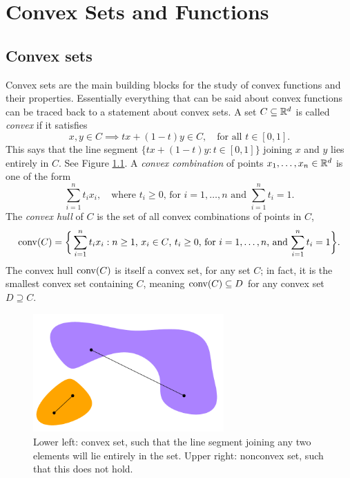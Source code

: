 \chapter{Convex Sets and Functions}
\label{chap:convex_sets_functions}

\section{Convex sets}  
\label{sec:convex_sets}

Convex sets are the main building blocks for the study of convex functions and
their properties. Essentially everything that can be said about convex
functions can be traced back to a statement about convex sets. A set $C
\subseteq \mathbb{R}^d$ is called \emph{convex} if it satisfies 
\begin{equation}
\label{eq:convex_set}
x, y \in C \implies t x + (1-t) y \in C, \quad \text{for all $t \in [0,1]$}. 
\end{equation}
This says that the line segment $\{ tx + (1-t) y : t \in [0,1] \}$ joining $x$
and $y$ lies entirely in $C$. See Figure \ref{fig:convex_set}. A \emph{convex 
  combination} of points $x_1,\ldots,x_n \in \mathbb{R}^d$ is one of the form   
\[
\sum_{i=1}^n t_i x_i, \quad \text{where $t_i \geq 0$, for $i=1,\ldots,n$ and 
  $\sum_{i=1}^n t_i = 1$}. 
\] 
The \emph{convex hull} of $C$ is the set of all convex combinations of points in
$C$, 
\[ 
\operatorname{conv}(C) = \bigg\{
\sum_{i=1}^n t_i x_i : 
\text{$n \geq 1$, $x_i \in C$, $t_i \geq 0$, for $i=1,\ldots,n$, and 
  $\sum_{i=1}^n t_i = 1$} \bigg\}. 
\]
The convex hull $\operatorname{conv}(C)$ is itself a convex set, for any set $C$; in fact, it
is the smallest convex set containing $C$, meaning $\operatorname{conv}(C) \subseteq D$ for 
any convex set $D \supseteq C$. 

\begin{figure}[tb]
\centering
\includegraphics[width=0.65\textwidth]{fig/convex_set.pdf}
\caption{Lower left: convex set, such that the line segment joining any two 
  elements will lie entirely in the set. Upper right: nonconvex set, such
  that this does not hold.} 
\label{fig:convex_set}
\end{figure}

